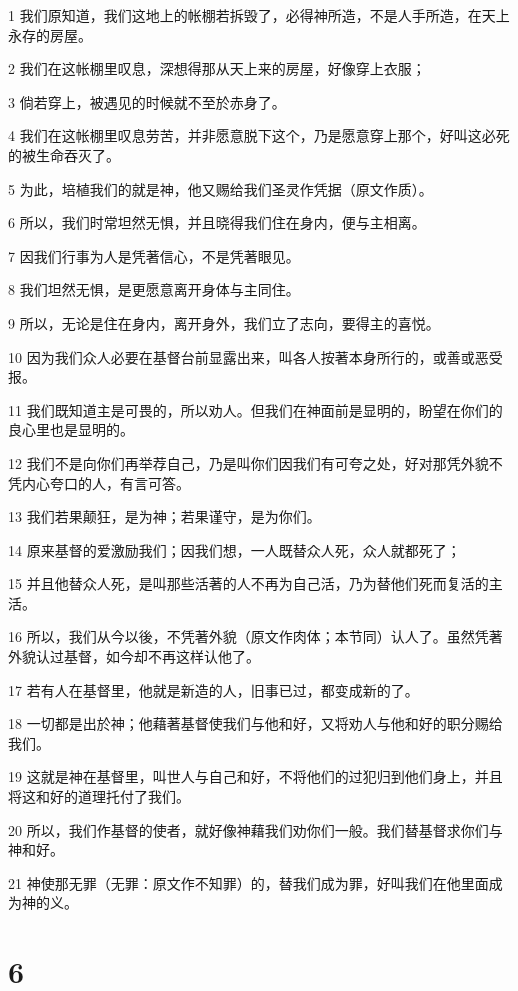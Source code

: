 \par 1 我们原知道，我们这地上的帐棚若拆毁了，必得神所造，不是人手所造，在天上永存的房屋。
\par 2 我们在这帐棚里叹息，深想得那从天上来的房屋，好像穿上衣服；
\par 3 倘若穿上，被遇见的时候就不至於赤身了。
\par 4 我们在这帐棚里叹息劳苦，并非愿意脱下这个，乃是愿意穿上那个，好叫这必死的被生命吞灭了。
\par 5 为此，培植我们的就是神，他又赐给我们圣灵作凭据（原文作质）。
\par 6 所以，我们时常坦然无惧，并且晓得我们住在身内，便与主相离。
\par 7 因我们行事为人是凭著信心，不是凭著眼见。
\par 8 我们坦然无惧，是更愿意离开身体与主同住。
\par 9 所以，无论是住在身内，离开身外，我们立了志向，要得主的喜悦。
\par 10 因为我们众人必要在基督台前显露出来，叫各人按著本身所行的，或善或恶受报。
\par 11 我们既知道主是可畏的，所以劝人。但我们在神面前是显明的，盼望在你们的良心里也是显明的。
\par 12 我们不是向你们再举荐自己，乃是叫你们因我们有可夸之处，好对那凭外貌不凭内心夸口的人，有言可答。
\par 13 我们若果颠狂，是为神；若果谨守，是为你们。
\par 14 原来基督的爱激励我们；因我们想，一人既替众人死，众人就都死了；
\par 15 并且他替众人死，是叫那些活著的人不再为自己活，乃为替他们死而复活的主活。
\par 16 所以，我们从今以後，不凭著外貌（原文作肉体；本节同）认人了。虽然凭著外貌认过基督，如今却不再这样认他了。
\par 17 若有人在基督里，他就是新造的人，旧事已过，都变成新的了。
\par 18 一切都是出於神；他藉著基督使我们与他和好，又将劝人与他和好的职分赐给我们。
\par 19 这就是神在基督里，叫世人与自己和好，不将他们的过犯归到他们身上，并且将这和好的道理托付了我们。
\par 20 所以，我们作基督的使者，就好像神藉我们劝你们一般。我们替基督求你们与神和好。
\par 21 神使那无罪（无罪：原文作不知罪）的，替我们成为罪，好叫我们在他里面成为神的义。

\chapter{6}

